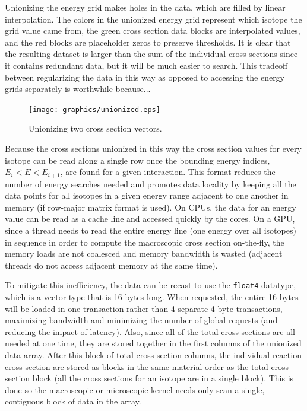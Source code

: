 Unionizing the energy grid makes holes in the data, %
which are filled by linear interpolation. The colors in the unionized energy grid represent which isotope the grid value came from, the green cross section data blocks are interpolated values, and the red blocks are placeholder zeros to preserve thresholds. It is clear that the resulting dataset is larger than the sum of the individual cross sections since it contains redundant data, but it will be much easier to search.%
  This tradeoff between regularizing the data in this way as opposed to accessing the energy grids separately is worthwhile because...  
  
\begin{figure}[h!] 
\centering
\texttt{[image: graphics/unionized.eps]}
\caption{Unionizing two cross section vectors. \label{unionized_layout} }
\end{figure}

Because the cross sections unionized in this way the cross section values for every isotope can be read along a single row once the bounding energy indices, $E_i<E<E_{i+1}$, are found for a given interaction.  This format reduces the number of energy searches needed and promotes data locality by keeping all the data points for all isotopes in a given energy range adjacent to one another in memory (if row-major matrix format is used).  On CPUs, the data for an energy value can be read as a cache line and accessed quickly by the cores.  On a GPU, since a thread needs to read the entire energy line (one energy over all isotopes) in sequence in order to compute the macroscopic cross section on-the-fly, the memory loads are not coalesced and memory bandwidth is wasted (adjacent threads do not access adjacent memory at the same time).  %

To mitigate this inefficiency, the data can be recast to use the  \lstinline{float4} datatype, which is a vector type that is 16 bytes long.  When requested, the entire 16 bytes will be loaded in one transaction rather than 4 separate 4-byte transactions, maximizing bandwidth and minimizing the number of global requests (and reducing the impact of latency).  Also, since all of the total cross sections are all needed at one time, %
 they are stored together in the first columns of the unionized data array.  After this block of total cross section columns, the individual reaction cross section are stored as blocks in the same material order as the total cross section block (all the cross sections for an isotope are in a single block).%
   This is done so the macroscopic or microscopic kernel needs only scan a single, contiguous block of data in the array.

